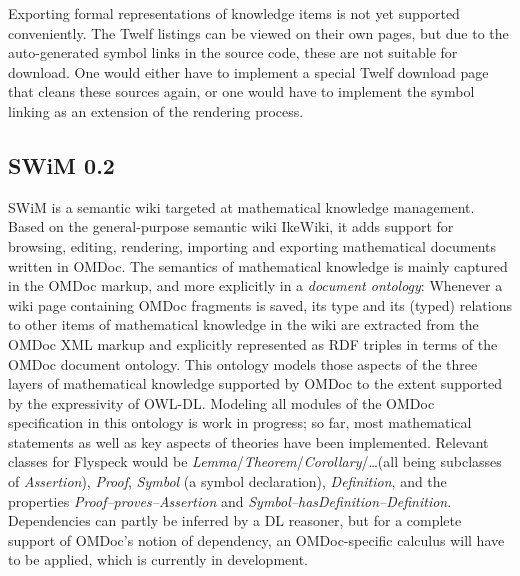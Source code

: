 Exporting formal representations of knowledge items is not yet supported
conveniently.  The Twelf listings can be viewed on their own pages, but due to
the auto-generated symbol links in the source code, these are not suitable for
download.  One would either have to implement a special Twelf download page that
cleans these sources again, or one would have to implement the symbol linking as
an extension of the rendering process.

\subsection{SWiM 0.2}
\label{sec:swim}

SWiM is a semantic wiki targeted at mathematical knowledge management.  Based on
the general-purpose semantic wiki IkeWiki\cite{KrSchVr:semwiki-reasoning07}, it
adds support for browsing, editing, rendering, importing and exporting
mathematical documents written in OMDoc.  The semantics of mathematical
knowledge is mainly captured in the OMDoc markup, and more explicitly in a
\emph{document ontology}: Whenever a wiki page containing OMDoc fragments is
saved, its type and its (typed) relations to other items of mathematical
knowledge in the wiki are extracted from the OMDoc XML markup and explicitly
represented as RDF triples in terms of the OMDoc document
ontology\cite{OMDocDocOnto:web}.  This ontology models those aspects of the
three layers of mathematical knowledge supported by OMDoc to the extent
supported by the expressivity of OWL-DL.  Modeling all modules of the OMDoc
specification in this ontology is work in progress; so far, most mathematical
statements as well as key aspects of theories have been implemented.  Relevant
classes for Flyspeck would be
\textit{Lemma}/\textit{Theorem}/\textit{Corollary}/\ldots (all being subclasses
of \textit{Assertion}), \textit{Proof}, \textit{Symbol} (a symbol declaration),
\textit{Definition}, and the properties \textit{Proof--proves--Assertion} and
\textit{Symbol--hasDefinition--Definition}.  Dependencies can partly be inferred
by a DL reasoner, but for a complete support of OMDoc's notion of dependency, an
OMDoc-specific calculus will have to be applied, which is currently in
development.

